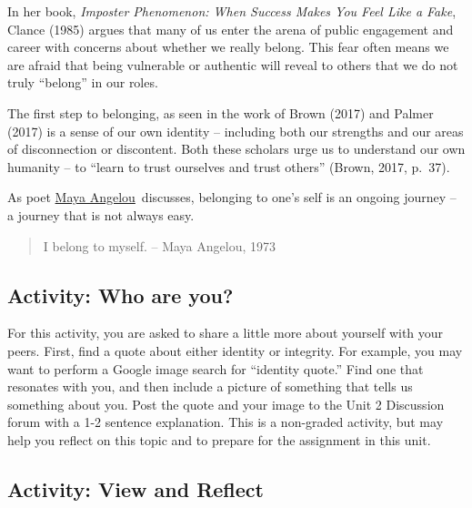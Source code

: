 \documentclass[
]{book}
\begin{document}
In her book, \emph{Imposter Phenomenon: When Success Makes You Feel Like a Fake}, Clance (1985) argues that many of us enter the arena of public engagement and career with concerns about whether we really belong. This fear often means we are afraid that being vulnerable or authentic will reveal to others that we do not truly ``belong'' in our roles.

The first step to belonging, as seen in the work of Brown (2017) and Palmer (2017) is a sense of our own identity -- including both our strengths and our areas of disconnection or discontent. Both these scholars urge us to understand our own humanity -- to ``learn to trust ourselves and trust others'' (Brown, 2017, p.~37).

As poet \href{http://billmoyers.com/content/conversation-maya-angelou/}{Maya Angelou}~discusses, belonging to one's self is an ongoing journey -- a journey that is not always easy.

\begin{quote}
I belong to myself. -- Maya Angelou, 1973
\end{quote}

\hypertarget{activity-who-are-you}{%
\subsection*{Activity: Who are you?}\label{activity-who-are-you}}

\begin{reflect}
For this activity, you are asked to share a little more about yourself
with your peers. First, find a quote about either identity or integrity.
For example, you may want to perform a Google image search for
``identity quote.'' Find one that resonates with you, and then include a
picture of something that tells us something about you. Post the quote
and your image to the Unit 2 Discussion forum with a 1-2 sentence
explanation. This is a non-graded activity, but may help you reflect on
this topic and to prepare for the assignment in this unit.
\end{reflect}

\hypertarget{activity-view-and-reflect}{%
\subsection*{Activity: View and Reflect}\label{activity-view-and-reflect}}
\end{document}
